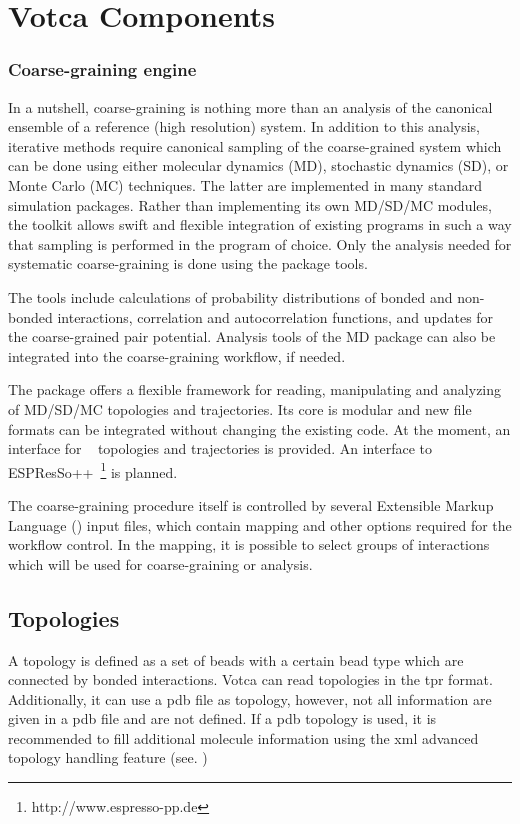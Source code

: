 \chapter{Votca Components}
\subsection{Coarse-graining engine}

In a nutshell, coarse-graining is nothing more than an analysis of the canonical ensemble of a reference (high resolution) system. In addition to this analysis, iterative methods require canonical sampling of the coarse-grained system which can be done using either molecular dynamics (MD), stochastic dynamics (SD), or Monte Carlo (MC) techniques. The latter are implemented in many standard simulation packages. Rather than implementing its own MD/SD/MC modules, the toolkit allows swift and flexible integration of existing  programs in such a way that sampling is performed in the program of choice. Only the analysis needed for systematic coarse-graining is done using the package tools.

The tools include calculations of probability distributions of bonded and non-bonded interactions, correlation and autocorrelation functions, and updates for the coarse-grained pair potential. Analysis tools of the MD package can also be integrated into the coarse-graining workflow, if needed.

The package offers a flexible framework for reading, manipulating and analyzing of MD/SD/MC topologies and trajectories. Its core is modular and new file formats can be integrated without changing the existing code. At the moment, an interface for \gromacs~\cite{gromacs4} topologies and trajectories is provided. An interface to ESPResSo++~\footnote{{\rm http://www.espresso-pp.de} } is planned.

The coarse-graining procedure itself is controlled by several Extensible Markup Language (\xml) input files, which contain mapping and other options required for the workflow control. In the mapping, it is possible to select groups of interactions which will be used for coarse-graining or analysis. 


\section{Topologies}
A topology is defined as a set of beads with a certain bead type which are connected by bonded interactions.
Votca can read topologies in the \gromacs tpr format. Additionally, it can use a pdb file as topology, however, not all information are given in a pdb file and are not defined. If a pdb topology is used, it is recommended to fill additional molecule information using the xml advanced topology handling feature (see. )
